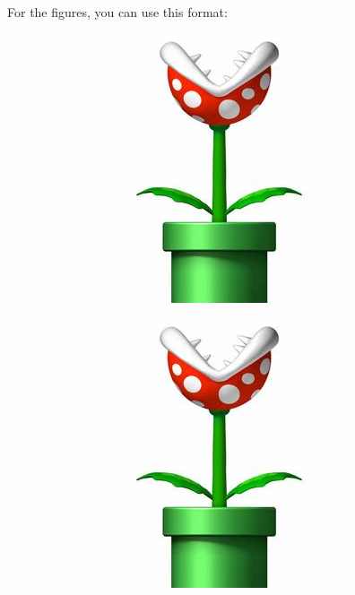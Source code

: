 For the figures, you can use this format:
%
	\begin{figure}[h!]\centering
	\begin{subfigure}{.05\textwidth}%
		\caption{}\label{sfig:secondary1}\vspace*{5cm}
	\end{subfigure}
	\begin{subfigure}{.43\textwidth} 
			\includegraphics[width=\linewidth]{1-Theory/figs/plant}		
	\end{subfigure}
	\begin{subfigure}{.05\textwidth}%
		\vspace{-5cm}\caption{}\label{sfig:secondaty2}
		\end{subfigure}
	\begin{subfigure}{.43\textwidth} 
			\includegraphics[width=\linewidth]{1-Theory/figs/plant}

\end{subfigure}
\end{figure}
